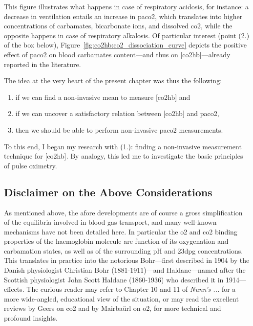 This figure illustrates what happens in case of respiratory acidosis, for instance: a decrease in ventilation entails an increase in \gls{paco2}, which translates into higher concentrations of carbamates, bicarbonate ions, and dissolved \gls{co2}, while the opposite happens in case of respiratory alkalosis. Of particular interest (point (2.) of the box below), Figure~\ref{fig:co2hb:co2_dissociation_curve} depicts the positive effect of \gls{paco2} on blood carbamates content---and thus on [\gls{co2hb}]---already reported in the literature\cite{bauer1972, perrella1975a, gros1976}.
\begin{keypointbox}
	The idea at the very heart of the present chapter was thus the following:
	\begin{enumerate}
		\item if we can find a non-invasive mean to measure [\gls{co2hb}] and
		\item if we can uncover a satisfactory relation between [\gls{co2hb}] and \gls{paco2},
		\item then we should be able to perform non-invasive \gls{paco2} measurements.
	\end{enumerate}
	To this end, I began my research with (1.): finding a non-invasive measurement technique for [\gls{co2hb}]. By analogy, this led me to investigate the basic principles of pulse oximetry.
\end{keypointbox}

\subsection{Disclaimer on the Above Considerations}\label{sect:co2hb:abg_disclaimer}

As mentioned above, the afore developments are of course a gross simplification of the equilibria involved in blood gas transport, and many well-known mechanisms have not been detailed here. In particular the \gls{o2} and \gls{co2} binding properties of the haemoglobin molecule are function of its oxygenation and carbamation states, as well as of the surrounding pH and \gls{23dpg} concentrations. This translates in practice into the notorious Bohr---first described in 1904 by the Danish physiologist Christian Bohr (1881-1911)\cite{bohr1904}---and Haldane---named after the Scottish physiologist John Scott Haldane (1860-1936) who described it in 1914\cite{haldane1914}---effects. The curious reader may refer to Chapter 10 and 11 of \textit{Nunn's ...}\cite{nunns} for a more wide-angled, educational view of the situation, or may read the excellent reviews by Geers \etal{} on \gls{co2}\cite{geers2000} and by Mairbaürl \etal{} on \gls{o2}\cite{mairbaurl2012}, for more technical and profound insights.

